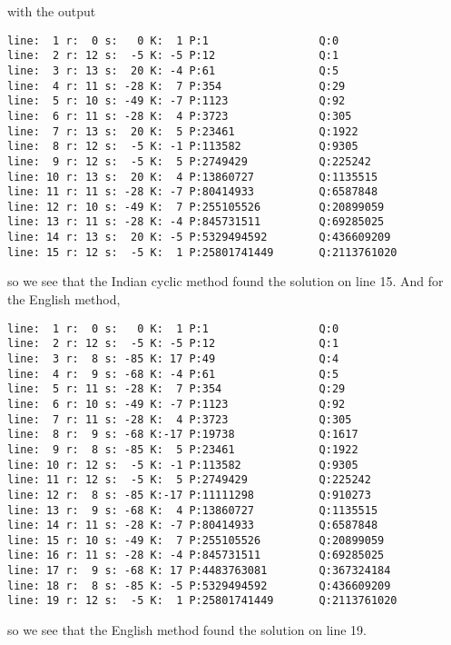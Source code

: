 \documentclass[aps,preprint,preprintnumbers,nofootinbib,showpacs,prd]{revtex4-1}
\begin{document}
%
with the output
%
\begin{Verbatim}[baselinestretch=0.75]
line:  1 r:  0 s:   0 K:  1 P:1                 Q:0          
line:  2 r: 12 s:  -5 K: -5 P:12                Q:1          
line:  3 r: 13 s:  20 K: -4 P:61                Q:5          
line:  4 r: 11 s: -28 K:  7 P:354               Q:29         
line:  5 r: 10 s: -49 K: -7 P:1123              Q:92         
line:  6 r: 11 s: -28 K:  4 P:3723              Q:305        
line:  7 r: 13 s:  20 K:  5 P:23461             Q:1922       
line:  8 r: 12 s:  -5 K: -1 P:113582            Q:9305       
line:  9 r: 12 s:  -5 K:  5 P:2749429           Q:225242     
line: 10 r: 13 s:  20 K:  4 P:13860727          Q:1135515    
line: 11 r: 11 s: -28 K: -7 P:80414933          Q:6587848    
line: 12 r: 10 s: -49 K:  7 P:255105526         Q:20899059   
line: 13 r: 11 s: -28 K: -4 P:845731511         Q:69285025   
line: 14 r: 13 s:  20 K: -5 P:5329494592        Q:436609209  
line: 15 r: 12 s:  -5 K:  1 P:25801741449       Q:2113761020 
\end{Verbatim}
%
so we see that the Indian cyclic method found the solution on line 15. And for the English method, 
%
\begin{Verbatim}[baselinestretch=0.75]
line:  1 r:  0 s:   0 K:  1 P:1                 Q:0          
line:  2 r: 12 s:  -5 K: -5 P:12                Q:1          
line:  3 r:  8 s: -85 K: 17 P:49                Q:4          
line:  4 r:  9 s: -68 K: -4 P:61                Q:5          
line:  5 r: 11 s: -28 K:  7 P:354               Q:29         
line:  6 r: 10 s: -49 K: -7 P:1123              Q:92         
line:  7 r: 11 s: -28 K:  4 P:3723              Q:305        
line:  8 r:  9 s: -68 K:-17 P:19738             Q:1617       
line:  9 r:  8 s: -85 K:  5 P:23461             Q:1922       
line: 10 r: 12 s:  -5 K: -1 P:113582            Q:9305       
line: 11 r: 12 s:  -5 K:  5 P:2749429           Q:225242     
line: 12 r:  8 s: -85 K:-17 P:11111298          Q:910273     
line: 13 r:  9 s: -68 K:  4 P:13860727          Q:1135515    
line: 14 r: 11 s: -28 K: -7 P:80414933          Q:6587848    
line: 15 r: 10 s: -49 K:  7 P:255105526         Q:20899059   
line: 16 r: 11 s: -28 K: -4 P:845731511         Q:69285025   
line: 17 r:  9 s: -68 K: 17 P:4483763081        Q:367324184  
line: 18 r:  8 s: -85 K: -5 P:5329494592        Q:436609209  
line: 19 r: 12 s:  -5 K:  1 P:25801741449       Q:2113761020
\end{Verbatim}
%
so we see that the English method found the solution on line 19.
\end{document}

